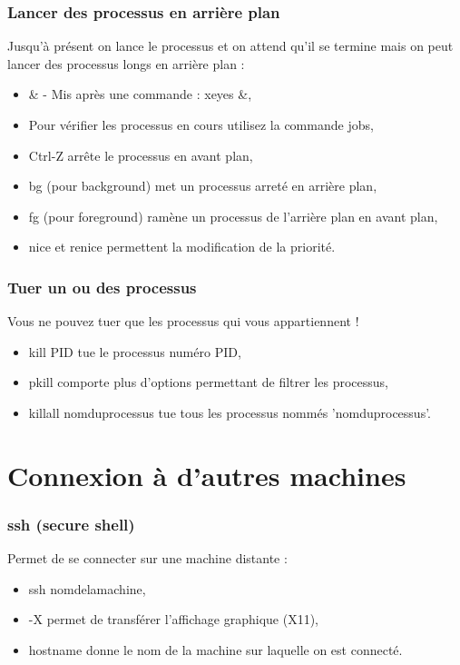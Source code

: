 \documentclass[handout,10pt]{beamer}
\begin{document}
\frame
{
    \frametitle{Lancer des processus en arrière plan}

    Jusqu'à présent on lance le processus et on attend qu'il se termine mais on peut lancer des processus longs en arrière plan :

    \begin{itemize}
        \item {\ttfamily \&} - Mis après une commande : {\ttfamily xeyes \&},
        \item  Pour vérifier les processus en cours utilisez la commande {\ttfamily jobs},
        \item {\ttfamily Ctrl-Z} arrête le processus en avant plan,
        \item {\ttfamily bg} (pour background) met un processus arreté en arrière plan,
        \item {\ttfamily fg} (pour foreground) ramène un processus de l'arrière plan en avant plan,
        \item {\ttfamily nice} et {\ttfamily renice} permettent la modification de la priorité.
    \end{itemize}
}


\frame
{
    \frametitle{Tuer un ou des processus}

    Vous ne pouvez tuer que les processus qui vous appartiennent !

    \begin{itemize}
        \item {\ttfamily kill PID} tue le processus numéro PID,
        \item {\ttfamily pkill} comporte plus d'options permettant de filtrer les processus,
        \item {\ttfamily killall nomduprocessus} tue tous les processus nommés 'nomduprocessus'.
    \end{itemize}
}


\section{Connexion à d'autres machines}
\frame
{
    \frametitle{ssh (secure shell)}

    Permet de se connecter sur une machine distante :

    \begin{itemize}
        \item {\ttfamily ssh nomdelamachine},
        \item {\ttfamily -X} permet de transférer l'affichage graphique (X11),
        \item {\ttfamily hostname} donne le nom de la machine sur laquelle on est connecté.
    \end{itemize}
}
\end{document}

